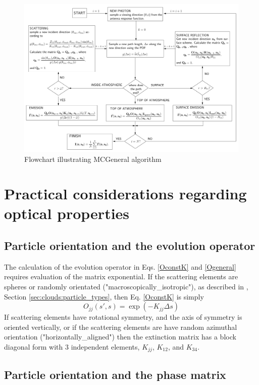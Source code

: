 \begin{figure}
\begin{center}
\includegraphics[width=\vsize,angle=90]{flowchart2}
\caption{Flowchart illustrating MCGeneral algorithm}
\end{center}
\label{fig:montecarlo:flowchart}
\end{figure}

\section{Practical considerations regarding optical properties}
\subsection{Particle orientation and the evolution operator}
The calculation of the evolution operator in Eqs. \ref{OconstK} and
\ref{Ogeneral} requires evaluation of the matrix exponential.  If the scattering
elements are spheres or randomly orientated ("macroscopically\_isotropic"), as described in
\user, Section \ref{sec:clouds:particle_types}, then Eq. \ref{OconstK} is simply
\begin{equation}
O_{jj}(s',s)=\exp\left(-K_{jj}\Delta s\right)
\label{OconstKp1020}
\end{equation}
If scattering elements have rotational symmetry, and the axis of symmetry is
oriented vertically, or if the scattering elements are have random azimuthal orientation
("horizontally\_aligned") then the extinction matrix has a block diagonal form with 3 independent
elements, $K_{jj}$, $K_{12}$, and $K_{34}$.

\subsection{Particle orientation and the phase matrix}
